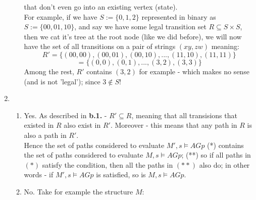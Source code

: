 \documentclass{article}
\begin{document}
\begin{enumerate}[label=\textbf{\alph*.}]
\begin{enumerate}[label=\textbf{\arabic*.}]
            that don't even go into an existing vertex (state).\\
            For example, if we have $S:=\{0,1,2\}$ represented in binary as $S:=\{00,01,10\}$,
            and say we have some legal transition set $R\subseteq S\times S$, then we cat it's tree
            at the root node (like we did before), we will now have the set of all transitions on
            a pair of strings $(xy,zw)$ meaning:
            \[
                R'=\{(00,00),(00,01),(00,10),...,(11,10),(11,11)\}
            \]\[
                =\{(0,0),(0,1),...,(3,2),(3,3)\}    
            \]
            Among the rest, $R'$ contains $(3,2)$ for example -
            which makes no sense (and is not 'legal'); since $3\notin S$!
    \end{enumerate}
    \item
    \begin{enumerate}[label=\textbf{\arabic*.}]
        \item Yes. As described in \textbf{b.1.} - $R'\subseteq R$,
            meaning that all transisions that existed in $R$ also exist in $R'$.
            Moreover - this means that any path in $R$ is also a path in $R'$.\\
            Hence the set of paths considered to evaluate $M',s\models AGp$ (*)
            contains the set of paths considered to evaluate $M,s\models AGp$; (**)
            so if all paths in $(*)$ satisfy the condition, then all the paths in $(**)$
            also do; in other words - if $M',s\models AGp$ is satisfied, so is $M,s\models AGp$.
        \item No. Take for example the structure $M$:
        \begin{center}
\end{center}
\end{enumerate}
\end{enumerate}
\end{document}
